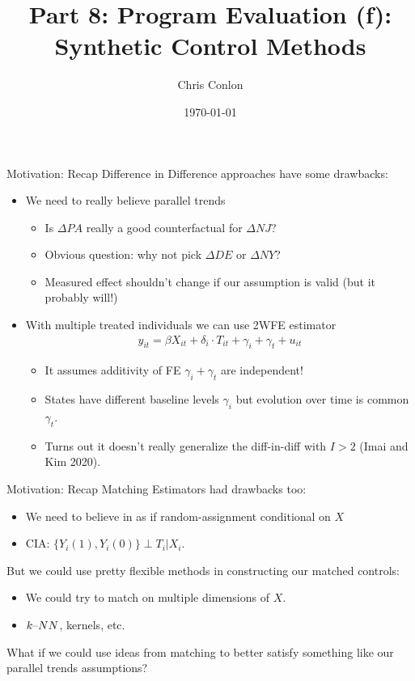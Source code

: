 \documentclass[xcolor=pdftex,dvipsnames,table,mathserif,aspectratio=169]{beamer}
\begin{document}
\title{Part 8: Program Evaluation (f):\\
Synthetic Control Methods}
\author{Chris Conlon}
\date{\today}

\frame{\titlepage}
\begin{frame}{Motivation: Recap}
Difference in Difference approaches have some drawbacks:
\begin{itemize}
\item We need to really believe \alert{parallel trends}
\begin{itemize}
\item Is $\Delta PA$ really a good counterfactual for  $\Delta NJ$?
\item Obvious question: why not pick $\Delta DE$ or $\Delta NY$?
\item Measured effect shouldn't change if our assumption is valid (but it probably will!)
\end{itemize}
\item With multiple treated individuals we can use 2WFE estimator
\begin{align*}
y_{it} = \beta X_{it} + \delta_i \cdot T_{it} +  \gamma_i + \gamma_t + u_{it}
\end{align*}
\vspace{-0.8cm}
\begin{itemize}
\item It assumes \alert{additivity} of FE $\gamma_i + \gamma_t$ are independent!
\item States have different baseline levels $\gamma_i$ but evolution over time is common $\gamma_t$.
\item Turns out it doesn't really generalize the diff-in-diff with $I > 2$ (Imai and Kim 2020).
\end{itemize}            
\end{itemize}              
\end{frame}


\begin{frame}{Motivation: Recap}
Matching Estimators had drawbacks too:
\begin{itemize}
\item We need to believe in as if random-assignment conditional on $X$
\item CIA: $\{Y_i(1), Y_i(0)\} \perp T_i | X_i$.
\end{itemize}
But we could use pretty flexible methods in constructing our matched controls:           
\begin{itemize}
\item We could try to match on multiple dimensions of $X$.
\item $k\text{\textendash}NN$, kernels, etc.
\end{itemize}
What if we could use ideas from \alert{matching} to better satisfy something like our \alert{parallel trends} assumptions?
\end{frame}
\end{document}
